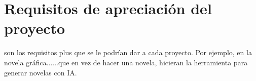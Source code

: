 \section{Requisitos de apreciación del proyecto}

son los requisitos plus que se le podrían dar a cada proyecto. Por ejemplo, en la novela gráfica......que en vez de hacer una novela, hicieran la herramienta para generar novelas con IA.